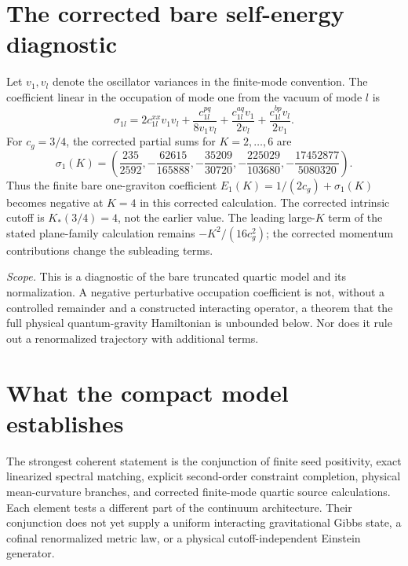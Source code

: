 \documentclass[11pt,a4paper,oneside]{book}
\theoremstyle{plain}
\theoremstyle{definition}
\theoremstyle{remark}
\newcommand{\src}[2]{\cite{#1}}
\newcommand{\scope}[1]{\par\smallskip\noindent\textit{Scope.} #1\par\smallskip}
\begin{document}
\section{The corrected bare self-energy diagnostic}
Let $v_1,v_l$ denote the oscillator variances in the finite-mode convention. The coefficient linear in the occupation of mode one from the vacuum of mode $l$ is
\begin{equation}
 \sigma_{1l}=2c^{xx}_{1l}v_1v_l
 +\frac{c^{pq}_{1l}}{8v_1v_l}
 +\frac{c^{aq}_{1l}v_1}{2v_l}
 +\frac{c^{bp}_{1l}v_l}{2v_1}.
 \label{eq:self-energy}
\end{equation}
For $c_g=3/4$, the corrected partial sums for $K=2,\ldots,6$ are
\begin{equation}
 \sigma_1(K)=
 \left(\frac{235}{2592},-\frac{62615}{165888},
 -\frac{35209}{30720},-\frac{225029}{103680},
 -\frac{17452877}{5080320}\right).
 \label{eq:self-energy-values}
\end{equation}
Thus the finite bare one-graviton coefficient $E_1(K)=1/(2c_g)+\sigma_1(K)$ becomes negative at $K=4$ in this corrected calculation. The corrected intrinsic cutoff is $K_*(3/4)=4$, not the earlier value. The leading large-$K$ term of the stated plane-family calculation remains $-K^2/(16c_g^2)$; the corrected momentum contributions change the subleading terms. \src{R19}{thm:v19v84-self-energy}

\scope{This is a diagnostic of the bare truncated quartic model and its normalization. A negative perturbative occupation coefficient is not, without a controlled remainder and a constructed interacting operator, a theorem that the full physical quantum-gravity Hamiltonian is unbounded below. Nor does it rule out a renormalized trajectory with additional terms.}

\section{What the compact model establishes}
The strongest coherent statement is the conjunction of finite seed positivity, exact linearized spectral matching, explicit second-order constraint completion, physical mean-curvature branches, and corrected finite-mode quartic source calculations. Each element tests a different part of the continuum architecture. Their conjunction does not yet supply a uniform interacting gravitational Gibbs state, a cofinal renormalized metric law, or a physical cutoff-independent Einstein generator.


\end{document}
